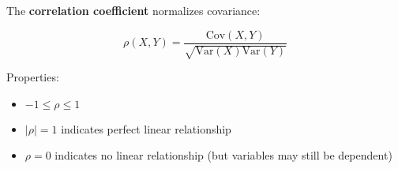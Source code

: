 The \textbf{correlation coefficient} normalizes covariance:

\begin{equation}
\rho(X, Y) = \frac{\text{Cov}(X, Y)}{\sqrt{\text{Var}(X)\text{Var}(Y)}}
\end{equation}

Properties:
\begin{itemize}
    \item $-1 \leq \rho \leq 1$
    \item $|\rho| = 1$ indicates perfect linear relationship
    \item $\rho = 0$ indicates no linear relationship (but variables may still be dependent)
\end{itemize}
